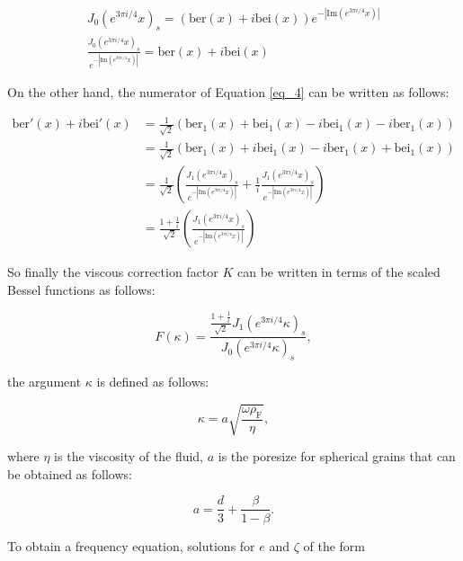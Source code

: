 \documentclass{article}[a4paper, 12pt]
\begin{document}
\begin{equation}
    \begin{array}{l}
        {J_0(e^{3\pi i/4}x)_s = (\mathrm{ber}(x)+i \mathrm{bei}(x)) e^{-\left\vert \mathrm{Im}(e^{3\pi i/4}x) \right\vert }}\\[1.5ex]
        \displaystyle \frac{J_0(e^{3\pi i/4}x)_s}{e^{-\left\vert \mathrm{Im}(e^{3\pi i/4}x) \right\vert }} = \mathrm{ber}(x)+i \mathrm{bei}(x)
    \end{array}
\end{equation}

On the other hand, the numerator of Equation \eqref{eq_4} can be written as follows:

\begin{equation}
 \begin{aligned}
    \mathrm{ber}'(x) + i\mathrm{bei}'(x) &= \frac{1}{\sqrt{2}}(\mathrm{ber}_1(x)+\mathrm{bei}_1(x)-i\mathrm{bei}_1(x)-i\mathrm{ber}_1(x))\\[1.5ex]
    &= \frac{1}{\sqrt{2}}\left(\mathrm{ber}_1(x)+i\mathrm{bei}_1(x)-i\mathrm{ber}_1(x)+\mathrm{bei}_1(x)\right)\\[1.5ex]
    & = \frac{1}{\sqrt{2}}\left( \frac{J_1(e^{3\pi i/4}x)_s}{e^{-\left\vert \mathrm{Im}(e^{3\pi i/4}x) \right\vert }}+\frac{1}{i} \frac{J_1(e^{3\pi i/4}x)_s}{e^{-\left\vert \mathrm{Im}(e^{3\pi i/4}x) \right\vert }}\right)\\[1.5ex]
    &=\displaystyle \frac{1+\frac{1}{i}}{\sqrt{2}}\left( \frac{J_1(e^{3\pi i/4}x)_s}{e^{-\left\vert \mathrm{Im}(e^{3\pi i/4}x) \right\vert }}\right)
\end{aligned}
\end{equation}

So finally the viscous correction factor $K$ can be written in terms of the scaled Bessel functions as follows:

$$ F(\kappa) = \displaystyle \frac{\frac{1+\frac{1}{i}}{\sqrt{2}}J_1(e^{3\pi i/4}\kappa)_s}{J_0(e^{3\pi i/4}\kappa)_s}, $$

the argument $\kappa$ is defined as follows:

$$ \kappa = a \sqrt{\frac{\omega\rho_{\mathrm{F}}}{\eta}}, $$

where $\eta$ is the viscosity of the fluid, $a$ is the poresize for spherical grains that can be obtained as follows:

$$ a = \frac{d}{3} + \frac{\beta}{1-\beta}. $$

To obtain a frequency equation, solutions for $e$ and $\zeta$ of the form
\end{document}
